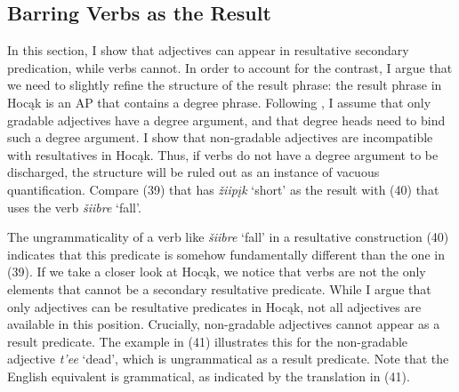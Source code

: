 \documentclass[output=paper]{LSP/langsci}
\begin{document}
\subsection{Barring Verbs as the Result}

In this section, I show that adjectives can appear in resultative secondary predication, while verbs cannot. In order to account for the contrast, I argue that we need to slightly refine the structure of the result phrase: the result phrase in Hocąk is an AP that contains a degree phrase. Following \citet{Cover1997}, I assume that only gradable adjectives have a degree argument, and that degree heads need to bind such a degree argument. I show that non-gradable adjectives are incompatible with resultatives in Hocąk. Thus, if verbs do not have a degree argument to be discharged, the structure will be ruled out as an instance of vacuous quantification. Compare (39) that has \textit{žiipįk} `short' as the result with (40) that uses the verb \textit{šiibre} `fall'.

\begin{exe}



\end{exe}

The ungrammaticality of a verb like \textit{šiibre} `fall' in a resultative construction (40) indicates that this predicate is somehow fundamentally different than the one in (39). If we take a closer look at Hocąk, we notice that verbs are not the only elements that cannot be a secondary resultative predicate. While I argue that only adjectives can be resultative predicates in Hocąk, not all adjectives are available in this position. Crucially, non-gradable adjectives cannot appear as a result predicate. The example in (41) illustrates this for the non-gradable adjective \textit{t'ee} `dead', which is ungrammatical as a result predicate. Note that the English equivalent is grammatical, as indicated by the translation in (41).
\end{document}
